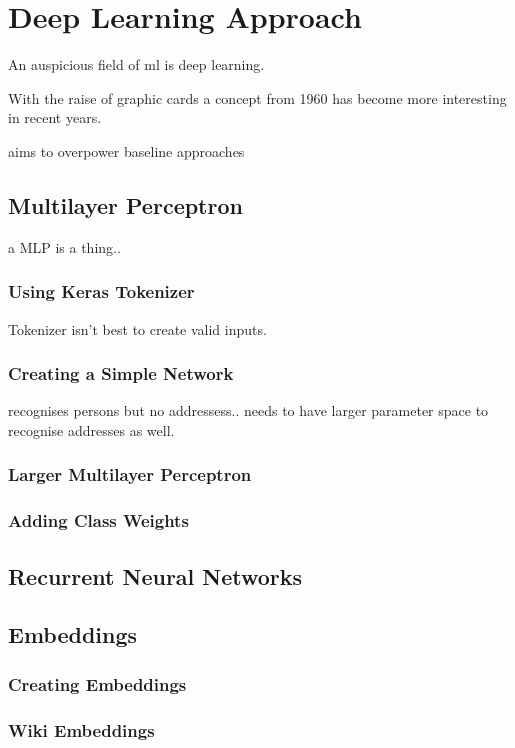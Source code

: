 \chapter{Deep Learning Approach}

An auspicious field of \acrlong{ml} is deep learning.

With the raise of graphic cards a concept from 1960 has become more interesting in recent years.

aims to overpower baseline approaches

\section{Multilayer Perceptron}

a MLP is a thing..

\subsection{Using Keras Tokenizer}

Tokenizer isn't best to create valid inputs.

\subsection{Creating a Simple Network}



recognises persons but no addressess.. needs to have larger parameter space to recognise addresses as well.


\subsection{Larger Multilayer Perceptron}

\subsection{Adding Class Weights}

\section{Recurrent Neural Networks}

\section{Embeddings}

\subsection{Creating Embeddings}

\subsection{Wiki Embeddings}

